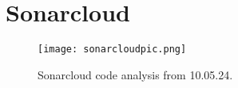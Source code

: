 \section{Sonarcloud}
\label{appendix:sonarcloud}
\begin{figure}[H]
    \begin{center}
        \texttt{[image: sonarcloudpic.png]}
    \end{center}
    \caption{Sonarcloud code analysis from 10.05.24.}
    \label{fig:sonarcloud-dashboard}
\end{figure}
